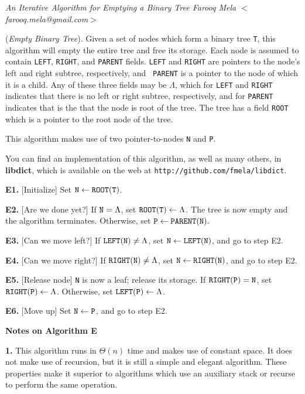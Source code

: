 \nopagenumbers
\parskip=2pt
\parindent=0pt

{\sl An Iterative Algorithm for Emptying a Binary Tree
	\hfill \rm Farooq Mela $<$farooq.mela@gmail.com$>$}

\medskip

 ({\it Empty Binary Tree}).
Given a set of nodes which form a binary tree {\tt T}, this algorithm will
empty the entire tree and free its storage. Each node is assumed to contain
{\tt LEFT}, {\tt RIGHT}, and {\tt PARENT} fields. {\tt LEFT} and {\tt RIGHT}
are pointers to the node's left and right subtree, respectively, and {\tt
PARENT} is a pointer to the node of which it is a child. Any of these three
fields may be $\Lambda$, which for {\tt LEFT} and {\tt RIGHT} indicates that
there is no left or right subtree, respectively, and for {\tt PARENT} indicates
that is the that the node is root of the tree. The tree has a field {\tt ROOT}
which is a pointer to the root node of the tree.

This algorithm makes use of two pointer-to-nodes {\tt N} and {\tt P}.

\medskip
You can find an implementation of this algorithm, as well as many others, in
{\bf libdict}, which is available on the web at
{\tt http://github.com/fmela/libdict}.
\medskip
\parindent=36pt

\item{\bf E1.} [Initialize]
Set ${\tt N} \gets {\tt ROOT(T)}$.

\item{\bf E2.} [Are we done yet?]
If ${\tt N} = \Lambda$, set ${\tt ROOT(T)} \gets \Lambda$.
The tree is now empty and the algorithm terminates.
Otherwise, set ${\tt P} \gets {\tt PARENT(N)}.$

\item{\bf E3.} [Can we move left?]
If ${\tt LEFT(N)} \neq \Lambda$, set ${\tt N} \gets {\tt LEFT(N)}$, and
go to step E2.

\item{\bf E4.} [Can we move right?]
If ${\tt RIGHT(N)} \neq \Lambda$, set ${\tt N} \gets {\tt RIGHT(N)}$, and
go to step E2.

\item{\bf E5.} [Release node]
{\tt N} is now a leaf; release its storage.
If ${\tt RIGHT(P)} = {\tt N}$, set ${\tt RIGHT(P)} \gets \Lambda$.
Otherwise, set ${\tt LEFT(P)} \gets \Lambda$.

\item{\bf E6.} [Move up]
Set ${\tt N} \gets {\tt P}$, and go to step E2.

\medskip
\parindent=0pt
{\bf Notes on Algorithm E}
\parindent=36pt
\item{\bf 1.} This algorithm runs in $\Theta(n)$ time and makes use of constant
space. It does not make use of recursion, but it is still a simple and elegant
algorithm. These properties make it superior to algorithms which use an
auxiliary stack or recurse to perform the same operation.

\parindent=0pt
\medskip

\bye
